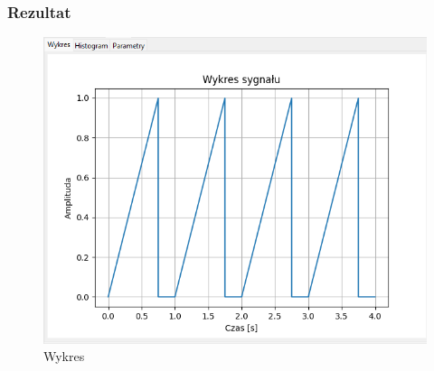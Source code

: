 \documentclass{article}
\begin{document}
\subsubsection{Rezultat}
\begin{figure}[h!]
    \centering
    \includegraphics[width=\textwidth]{img/mul/wykres.png}
    \caption{Wykres}
\end{figure}
\end{document}
